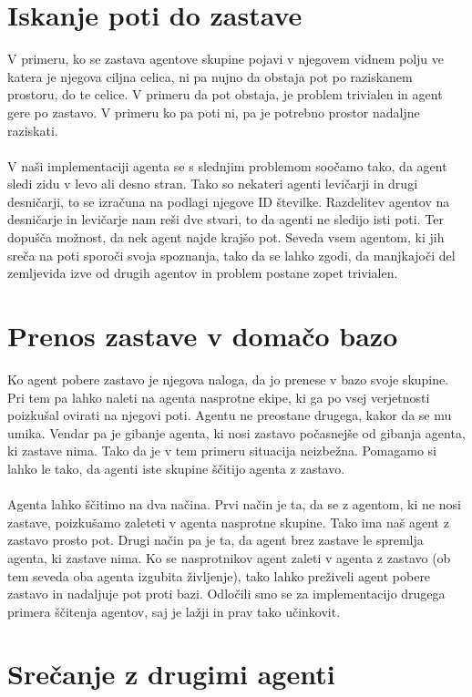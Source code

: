 \documentclass[12pt,a4paper,openany]{book}
\begin{document}
\section{Iskanje poti do zastave}

V primeru, ko se zastava agentove skupine pojavi v njegovem vidnem polju ve katera je njegova ciljna celica,
ni pa nujno da obstaja pot po raziskanem prostoru, do te celice. V primeru da pot obstaja, je problem trivialen
in agent gere po zastavo. V primeru ko pa poti ni, pa je potrebno prostor nadaljne raziskati.\\
\\
V naši implementaciji agenta se s slednjim problemom soočamo tako, da agent sledi zidu v levo ali desno stran.
Tako so nekateri agenti levičarji in drugi desničarji, to se izračuna na podlagi njegove ID številke. Razdelitev
agentov na desničarje in levičarje nam reši dve stvari, to da agenti ne sledijo isti poti. Ter dopušča možnost,
da nek agent najde krajšo pot. Seveda vsem agentom, ki jih sreča na poti sporoči svoja spoznanja, tako da se lahko zgodi,
da manjkajoči del zemljevida izve od drugih agentov in problem postane zopet trivialen.


\section{Prenos zastave v domačo bazo}

Ko agent pobere zastavo je njegova naloga, da jo prenese v bazo svoje skupine.
 Pri tem pa lahko naleti na agenta nasprotne ekipe, ki ga po vsej verjetnosti 
poizkušal ovirati na njegovi poti. Agentu ne preostane drugega, kakor da se mu umika.
Vendar pa je gibanje agenta, ki nosi zastavo počasnejše od gibanja agenta, ki zastave nima.
Tako da je v tem primeru situacija neizbežna. Pomagamo si lahko le tako, da agenti iste 
skupine ščitijo agenta z zastavo.\\
\\
Agenta lahko ščitimo na dva načina. Prvi način je ta, da se z agentom, ki ne nosi zastave,
poizkušamo zaleteti v  agenta nasprotne skupine. Tako ima naš agent z zastavo prosto pot. 
Drugi način pa je ta, da agent brez zastave le spremlja agenta, ki zastave nima. Ko se 
nasprotnikov agent zaleti v agenta z zastavo (ob tem seveda oba agenta izgubita življenje), 
tako lahko preživeli agent pobere zastavo in nadaljuje pot proti bazi. Odločili smo se za 
implementacijo drugega primera ščitenja agentov, saj je lažji in prav tako učinkovit.


\section{Srečanje z drugimi agenti}
\end{document}
